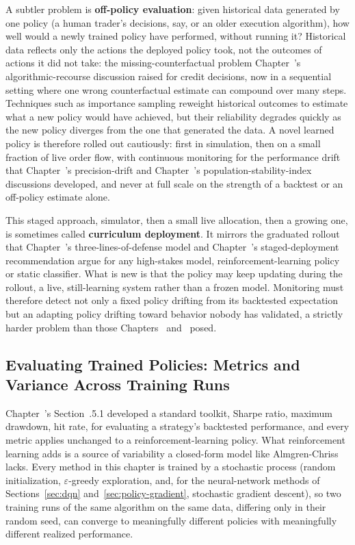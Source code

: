 \documentclass[../ai_in_finance]{subfiles}
\begin{document}
A subtler problem is \textbf{off-policy evaluation}: given historical data generated by one policy (a human trader's decisions, say, or an older execution algorithm), how well would a newly trained policy have performed, without running it? Historical data reflects only the actions the deployed policy took, not the outcomes of actions it did not take: the missing-counterfactual problem Chapter~'s algorithmic-recourse discussion raised for credit decisions, now in a sequential setting where one wrong counterfactual estimate can compound over many steps. Techniques such as importance sampling reweight historical outcomes to estimate what a new policy would have achieved, but their reliability degrades quickly as the new policy diverges from the one that generated the data. A novel learned policy is therefore rolled out cautiously: first in simulation, then on a small fraction of live order flow, with continuous monitoring for the performance drift that Chapter~'s precision-drift and Chapter~'s population-stability-index discussions developed, and never at full scale on the strength of a backtest or an off-policy estimate alone.

This staged approach, simulator, then a small live allocation, then a growing one, is sometimes called \textbf{curriculum deployment}. It mirrors the graduated rollout that Chapter~'s three-lines-of-defense model and Chapter~'s staged-deployment recommendation argue for any high-stakes model, reinforcement-learning policy or static classifier. What is new is that the policy may keep updating during the rollout, a live, still-learning system rather than a frozen model. Monitoring must therefore detect not only a fixed policy drifting from its backtested expectation but an adapting policy drifting toward behavior nobody has validated, a strictly harder problem than those Chapters~ and~ posed.

\subsection{Evaluating Trained Policies: Metrics and Variance Across Training Runs}
\label{sec:rl-eval-metrics}

Chapter~'s Section~.5.1 developed a standard toolkit, Sharpe ratio, maximum drawdown, hit rate, for evaluating a strategy's backtested performance, and every metric applies unchanged to a reinforcement-learning policy. What reinforcement learning adds is a source of variability a closed-form model like Almgren-Chriss lacks. Every method in this chapter is trained by a stochastic process (random initialization, $\varepsilon$-greedy exploration, and, for the neural-network methods of Sections~\ref{sec:dqn} and~\ref{sec:policy-gradient}, stochastic gradient descent), so two training runs of the same algorithm on the same data, differing only in their random seed, can converge to meaningfully different policies with meaningfully different realized performance.
\end{document}
